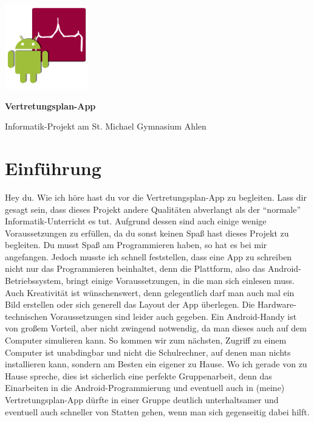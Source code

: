 \documentclass[12pt,headsepline]{scrartcl}
\begin{document}
\begin{center}
\includegraphics[]{icon_android.png}

\textbf{\Huge{Vertretungsplan-App}}

Informatik-Projekt am St. Michael Gymnasium Ahlen
\end{center}
\vspace{6cm}
\tableofcontents

\newpage
\setcounter{page}{1}
\pagestyle{headings}
\cfoot{} \ifoot{} \ofoot{}\chead{}
\ohead{\pagemark}
\ihead{\rightmark}
\pagestyle{scrheadings}

\section{Einführung}
Hey du.
Wie ich höre hast du vor die Vertretungsplan-App zu begleiten. Lass dir gesagt sein, dass dieses Projekt andere Qualitäten abverlangt als der ``normale'' Informatik-Unterricht es tut. Aufgrund dessen sind auch einige wenige Voraussetzungen zu erfüllen, da du sonst keinen Spaß hast dieses Projekt zu begleiten. Du musst Spaß am Programmieren haben, so hat es bei mir angefangen. Jedoch musste ich schnell feststellen, dass eine App zu schreiben nicht nur das Programmieren beinhaltet, denn die Plattform, also das Android-Betriebssystem, bringt einige Voraussetzungen, in die man sich einlesen muss. Auch Kreativität ist wünschenswert, denn gelegentlich darf man auch mal ein Bild erstellen oder sich generell das Layout der App überlegen. Die Hardware-technischen Voraussetzungen sind leider auch gegeben. Ein Android-Handy ist von großem Vorteil, aber nicht zwingend notwendig, da man dieses auch auf dem Computer simulieren kann. 
So kommen wir zum nächsten, Zugriff zu einem Computer ist unabdingbar und nicht die 
Schulrechner, auf denen man nichts installieren kann, sondern am Besten ein eigener zu Hause. Wo ich gerade von zu Hause spreche, dies ist sicherlich eine perfekte Gruppenarbeit, denn das Einarbeiten in die Android-Programmierung und eventuell auch in (meine) Vertretungsplan-App dürfte in einer Gruppe deutlich unterhaltsamer und eventuell auch schneller von Statten gehen, wenn man sich gegenseitig dabei hilft.
\end{document}
